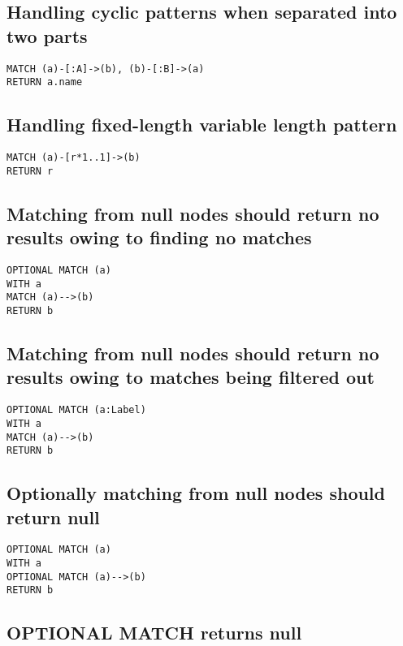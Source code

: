 \subsection{Handling cyclic patterns when separated into two parts}

\begin{lstlisting}
MATCH (a)-[:A]->(b), (b)-[:B]->(a)
RETURN a.name
\end{lstlisting}

\subsection{Handling fixed-length variable length pattern}

\begin{lstlisting}
MATCH (a)-[r*1..1]->(b)
RETURN r
\end{lstlisting}

\subsection{Matching from null nodes should return no results owing to finding no matches}

\begin{lstlisting}
OPTIONAL MATCH (a)
WITH a
MATCH (a)-->(b)
RETURN b
\end{lstlisting}

\subsection{Matching from null nodes should return no results owing to matches being filtered out}

\begin{lstlisting}
OPTIONAL MATCH (a:Label)
WITH a
MATCH (a)-->(b)
RETURN b
\end{lstlisting}

\subsection{Optionally matching from null nodes should return null}

\begin{lstlisting}
OPTIONAL MATCH (a)
WITH a
OPTIONAL MATCH (a)-->(b)
RETURN b
\end{lstlisting}

\subsection{OPTIONAL MATCH returns null}

